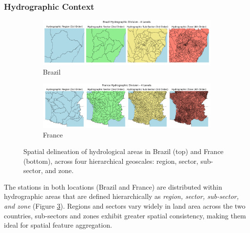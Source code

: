 \documentclass[ruler]{CUP-JNL-EDS}%
\begin{document}
\subsubsection*{Hydrographic Context}
\begin{figure}[htbp]
    \centering
    \begin{subfigure}[b]{1.0\textwidth}
        \centering
        \includegraphics[width=\textwidth]{./assets/images/brazil_hydrographic_levels.png}
        \caption{Brazil}
        \label{fig:brazil_hydrographic_levels}
    \end{subfigure}
    \begin{subfigure}[b]{1.0\textwidth}
        \centering
        \includegraphics[width=\textwidth]{./assets/images/france_hydrographic_levels.png}
        \caption{France}
        \label{fig:france_hydrographic_levels}
    \end{subfigure}
    \caption{Spatial delineation of hydrological areas in Brazil (top) and France (bottom), across four hierarchical geoscales: region, sector, sub-sector, and zone.}
    \label{fig:hydrographic_levels_combined}
\end{figure}
The stations in both locations (Brazil and France) are distributed within hydrographic 
areas that are defined hierarchically as \textit{region, sector, sub-sector, and zone} 
(Figure \ref{fig:hydrographic_levels_combined}). Regions and sectors vary widely in land area across the two countries, sub-sectors 
and zones exhibit greater spatial consistency, making them ideal for spatial feature 
aggregation. 
\end{document}
